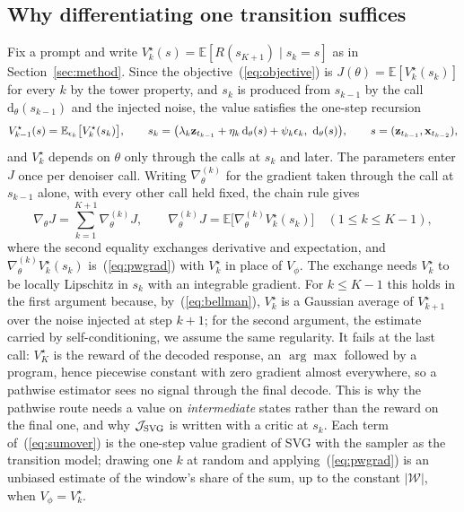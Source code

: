 \subsection{Why differentiating one transition suffices}
\label{app:pw_derivation}
Fix a prompt and write $V^\star_k(s)=\mathbb E[R(s_{K+1})\mid s_k=s]$ as in Section~\ref{sec:method}. Since the objective~(\ref{eq:objective}) is $J(\theta)=\mathbb E[V^\star_k(s_k)]$ for every $k$ by the tower property, and $s_k$ is produced from $s_{k-1}$ by the call $\mathrm d_\theta(s_{k-1})$ and the injected noise, the value satisfies the one-step recursion
\begin{equation}
V^\star_{k-1}(s)=\mathbb E_{\epsilon_k}\big[V^\star_k(s_k)\big],\qquad s_k=\big(\lambda_k{\mathbf{z}}_{t_{k-1}}+\eta_k\,\mathrm d_\theta(s)+\psi_k\epsilon_k,\ \mathrm d_\theta(s)\big),\qquad s=({\mathbf{z}}_{t_{k-1}},{\mathbf{x}}_{t_{k-2}}),
\label{eq:bellman}
\end{equation}
and $V^\star_k$ depends on $\theta$ only through the calls at $s_k$ and later. The parameters enter $J$ once per denoiser call. Writing $\nabla^{(k)}_\theta$ for the gradient taken through the call at $s_{k-1}$ alone, with every other call held fixed, the chain rule gives
\begin{equation}
\nabla_\theta J=\sum_{k=1}^{K+1}\nabla^{(k)}_\theta J,\qquad \nabla^{(k)}_\theta J=\mathbb E\big[\nabla^{(k)}_\theta V^\star_k(s_k)\big]\quad(1\le k\le K-1),
\label{eq:sumover}
\end{equation}
where the second equality exchanges derivative and expectation, and $\nabla^{(k)}_\theta V^\star_k(s_k)$ is~(\ref{eq:pwgrad}) with $V^\star_k$ in place of $V_\phi$. The exchange needs $V^\star_k$ to be locally Lipschitz in $s_k$ with an integrable gradient. For $k\le K-1$ this holds in the first argument because, by~(\ref{eq:bellman}), $V^\star_k$ is a Gaussian average of $V^\star_{k+1}$ over the noise injected at step $k{+}1$; for the second argument, the estimate carried by self-conditioning, we assume the same regularity. It fails at the last call: $V^\star_K$ is the reward of the decoded response, an $\arg\max$ followed by a program, hence piecewise constant with zero gradient almost everywhere, so a pathwise estimator sees no signal through the final decode. This is why the pathwise route needs a value on \emph{intermediate} states rather than the reward on the final one, and why $\mathcal J_{\rm SVG}$ is written with a critic at $s_k$. Each term of~(\ref{eq:sumover}) is the one-step value gradient of SVG \citep{heess2015svg} with the sampler as the transition model; drawing one $k$ at random and applying~(\ref{eq:pwgrad}) is an unbiased estimate of the window's share of the sum, up to the constant $|\mathcal W|$, when $V_\phi=V^\star_k$.

